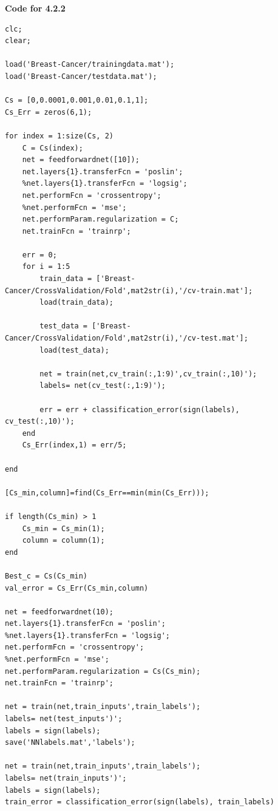 \documentclass[english]{article}
\begin{document}
\color{black}

\noindent\textbf{Code for 4.2.2}
\color{red}

\begin{verbatim}
clc;
clear;

load('Breast-Cancer/trainingdata.mat');
load('Breast-Cancer/testdata.mat');

Cs = [0,0.0001,0.001,0.01,0.1,1];
Cs_Err = zeros(6,1);

for index = 1:size(Cs, 2)        
    C = Cs(index);
    net = feedforwardnet([10]);
    net.layers{1}.transferFcn = 'poslin';
    %net.layers{1}.transferFcn = 'logsig';
    net.performFcn = 'crossentropy';
    %net.performFcn = 'mse';
    net.performParam.regularization = C;
    net.trainFcn = 'trainrp';
    
    err = 0;
    for i = 1:5
        train_data = ['Breast-Cancer/CrossValidation/Fold',mat2str(i),'/cv-train.mat'];
        load(train_data);

        test_data = ['Breast-Cancer/CrossValidation/Fold',mat2str(i),'/cv-test.mat'];
        load(test_data);

        net = train(net,cv_train(:,1:9)',cv_train(:,10)');
        labels= net(cv_test(:,1:9)');

        err = err + classification_error(sign(labels), cv_test(:,10)');
    end
    Cs_Err(index,1) = err/5;
    
end

[Cs_min,column]=find(Cs_Err==min(min(Cs_Err)));

if length(Cs_min) > 1
    Cs_min = Cs_min(1);
    column = column(1);
end

Best_c = Cs(Cs_min)
val_error = Cs_Err(Cs_min,column)

net = feedforwardnet(10);
net.layers{1}.transferFcn = 'poslin';
%net.layers{1}.transferFcn = 'logsig';
net.performFcn = 'crossentropy';
%net.performFcn = 'mse';
net.performParam.regularization = Cs(Cs_min);
net.trainFcn = 'trainrp';

net = train(net,train_inputs',train_labels');     
labels= net(test_inputs')';
labels = sign(labels);
save('NNlabels.mat','labels');

net = train(net,train_inputs',train_labels');     
labels= net(train_inputs')';
labels = sign(labels);
train_error = classification_error(sign(labels), train_labels)

\end{verbatim}
\end{document}
